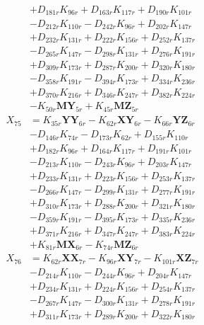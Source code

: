 \begin{multicols}{2}
\begin{align}
&+ D_{181r}K_{96r} + D_{163r}K_{117r} + D_{190r}K_{101r}  \nonumber \\
&- D_{212r}K_{110r} - D_{242r}K_{96r} + D_{202r}K_{147r}  \nonumber \\
&+ D_{232r}K_{131r} + D_{222r}K_{156r} + D_{252r}K_{137r}  \nonumber \\
&- D_{265r}K_{147r} - D_{298r}K_{131r} + D_{276r}K_{191r}  \nonumber \\
&+ D_{309r}K_{173r} + D_{287r}K_{200r} + D_{320r}K_{180r}  \nonumber \\
&- D_{358r}K_{191r} - D_{394r}K_{173r} + D_{334r}K_{236r}  \nonumber \\
&+ D_{370r}K_{216r} + D_{346r}K_{247r} + D_{382r}K_{224r}  \nonumber \\
&- K_{50r}\mathbf{MY}_{5r} + K_{45r}\mathbf{MZ}_{5r} \nonumber \\
X_{75} &= K_{35r}\mathbf{YY}_{6r} - K_{62r}\mathbf{XY}_{6r} - K_{66r}\mathbf{YZ}_{6r}  \nonumber \\
&- D_{146r}K_{74r} - D_{173r}K_{62r} + D_{155r}K_{110r}  \nonumber \\
&+ D_{182r}K_{96r} + D_{164r}K_{117r} + D_{191r}K_{101r}  \nonumber \\
&- D_{213r}K_{110r} - D_{243r}K_{96r} + D_{203r}K_{147r}  \nonumber \\
&+ D_{233r}K_{131r} + D_{223r}K_{156r} + D_{253r}K_{137r}  \nonumber \\
&- D_{266r}K_{147r} - D_{299r}K_{131r} + D_{277r}K_{191r}  \nonumber \\
&+ D_{310r}K_{173r} + D_{288r}K_{200r} + D_{321r}K_{180r}  \nonumber \\
&- D_{359r}K_{191r} - D_{395r}K_{173r} + D_{335r}K_{236r}  \nonumber \\
&+ D_{371r}K_{216r} + D_{347r}K_{247r} + D_{383r}K_{224r}  \nonumber \\
&+ K_{81r}\mathbf{MX}_{6r} - K_{74r}\mathbf{MZ}_{6r} \nonumber \\
X_{76} &= K_{62r}\mathbf{XX}_{7r} - K_{96r}\mathbf{XY}_{7r} - K_{101r}\mathbf{XZ}_{7r}  \nonumber \\
&- D_{214r}K_{110r} - D_{244r}K_{96r} + D_{204r}K_{147r}  \nonumber \\
&+ D_{234r}K_{131r} + D_{224r}K_{156r} + D_{254r}K_{137r}  \nonumber \\
&- D_{267r}K_{147r} - D_{300r}K_{131r} + D_{278r}K_{191r}  \nonumber \\
&+ D_{311r}K_{173r} + D_{289r}K_{200r} + D_{322r}K_{180r}  \nonumber \\

\end{align}
\end{multicols}
